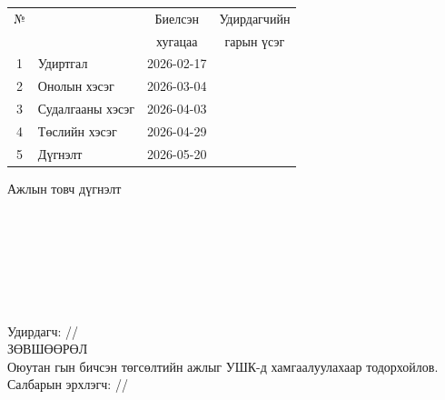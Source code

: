 \begin{titlepage}
\begin{center}
\begin{tabular}{|c|p{7cm}|c|c|}
	\hline
	№ & \makebox[7cm][c]{Хийж гүйцэтгэсэн ажил} & Биелсэн     & Удирдагчийн \\
	  &                    & хугацаа    & гарын үсэг \\ \hline
	1 & {Удиртгал}         & 2026-02-17 &  \\ \hline
	2 & {Онолын хэсэг}     & 2026-03-04 &  \\ \hline
	3 & {Судалгааны хэсэг} & 2026-04-03 &  \\ \hline
	4 & {Төслийн хэсэг}    & 2026-04-29 &  \\ \hline
	5 & {Дүгнэлт}          & 2026-05-20 &  \\ \hline
\end{tabular}

\vspace{1cm}
Ажлын товч дүгнэлт \\[0.5cm]
\dotfill \\[0.2cm]
\dotfill \\[0.2cm]
\dotfill \\[0.2cm]
\dotfill \\[0.2cm]
\dotfill \\[0.2cm]
\dotfill \\[0.2cm]
\dotfill \\[0.5cm]
Удирдагч: \makebox[3cm]{\dotfill} /\supname/ \\

\vspace{2cm}
ЗӨВШӨӨРӨЛ \\[0.5cm]
Оюутан \shortname гын бичсэн төгсөлтийн ажлыг УШК-д хамгаалуулахаар тодорхойлов.\\[0.5cm]
Салбарын эрхлэгч: \makebox[3cm]{\dotfill} /\chairname/
\end{center}

\end{titlepage}

\newpage

